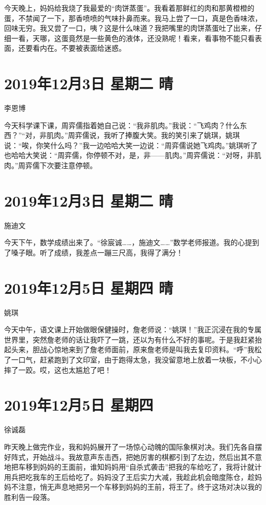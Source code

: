今天晚上，妈妈给我烧了我最爱的“肉饼蒸蛋”。我看着那鲜红的肉和那黄橙橙的蛋，不禁闻了一下，那香喷喷的气味扑鼻而来。我马上尝了一口，真是色香味浓，回味无穷。我又尝了一口，咦？这是什么味道？我把嘴里的肉饼蒸蛋吐了出来，仔细一看，天哪，这蛋竟然是一些黄色的液体，还没熟呢！看来，看事物不能只看表面，还要看内在。不要被表面给迷惑。

\section{2019年12月3日 星期二 晴}

李恩博

今天科学课下课，周弈儒指着她自己说：“我非肌肉。”我说：“飞鸡肉？什么东西？”“对，非肌肉。”周弈儒说，我听了捧腹大笑。我的笑引来了姚琪，姚琪说：“唉，你笑什么吗？”我一边哈哈大笑一边说：“周弈儒说她飞鸡肉。”姚琪听了也哈哈大笑说：“周弈儒，你停顿不对，是，非——肌肉。”周弈儒说：“对呀，非肌肉。”周弈儒下次要注意停顿。

\section{2019年12月3日 星期二 晴}

施迪文

今天下午，数学成绩出来了。“徐宸诚……，施迪文……”数学老师报道。我的心提到了嗓子眼。听了成绩，我差点一蹦三尺高，我得了满分！

\section{2019年12月5日 星期四 晴}

姚琪

今天中午，语文课上开始做眼保健操时，詹老师说：“姚琪！”我正沉浸在我的专属世界里，突然詹老师的话让我吓了一跳，还以为有什么不好的事呢。于是我赶紧抬起头来，胆战心惊地来到了詹老师面前，原来詹老师是叫我去复印资料。“呼”我松了一口气，赶紧跑到了文印室，由于跑得太急，我没留意地上放着一块板，不小心摔了一跤。哎，这也太尴尬了吧！

\section{2019年12月5日 星期四}

徐诚磊

昨天晚上做完作业，我和妈妈展开了一场惊心动魄的国际象棋对决。我们先各自摆好阵式，开始战斗。我故意声东击西，把她厉害的棋都引到了左边，然后出其不意地把车移到妈妈的王面前，谁知妈妈用“自杀式袭击”把我的车给吃了，我将计就计用兵把吃我车的王后给吃了。妈妈没了王后实力大减，我趁此机会暗度陈仓，趁妈妈不注意，悄无声息地把另一个车移到妈妈的王前，将王了。终于这场对决以我的胜利告一段落。

